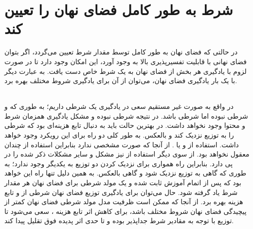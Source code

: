 \section{شرط به طور کامل فضای نهان را تعیین کند}
در حالتی که فضای نهان به طور کامل توسط مقدار شرط تعیین می‌گردد، اگر بتوان فضای نهانی با قابلیت تفسیرپذیری بالا به وجود آورد، این امکان وجود دارد تا در صورت لزوم با یادگیری هر بخش از فضای نهان به یک شرط خاص دست یافت. به عبارت دیگر با یک بار یادگیری فضای نهان، می‌توان از آن برای یادگیری شروط مختلف بهره برد.

\\
در واقع به صورت غیر مستقیم سعی در یادگیری یک \wae{} شرطی داریم؛ به طوری که \encoder{} و \decoder{} شرطی نبوده اما \priordist{} شرطی باشد. در نتیجه \decoder{} شرطی نبوده و مشکل یادگیری همزمان شرط و محتوا وجود نخواهد داشت. در بهترین حالت باید به دنبال تابع هزینه‌ای بود که \priordist{} شرطی را به توزیع \marginal{} \encoder{} نزدیک کند و بالعکس. به طور کلی دو راه برای این رویکرد وجود خواهد داشت. استفاده از \gan{} و یا \mmd{}. از آنجا که \priordist{} صورت مشخصی ندارد بنابراین استفاده از  \mmd{} چندان معقول نخواهد بود. از سوی دیگر استفاده از \gan{} نیز مشکل \modecollapse{} و سایر مشکلات ذکر شده را در پی دارد. بنابراین راه همواری برای نزدیک کردن دو توزیع به یکدیگر وجود ندارد؛ به طوری که گاهی \priordist{} به توزیع \marginal{} \encoder{} نزدیک شود و گاهی بالعکس. به همین دلیل تنها راه این خواهد بود که پس از اتمام آموزش \autoencoder{} ثابت شده و یک مولد شرطی برای فضای نهان هر مقدار شرط یاد گرفته شود. حال می‌توان برای یادگیری توزیع فضای نهان شرطی از \normalizingflownet{} و تابع هزینه \maxlikelihood{} بهره برد. از آنجا که ممکن است ظرفیت مدل مولد شرطی فضای نهان کمتر از پیچیدگی فضای نهان شروط مختلف باشد، برای کاهش اثر \meanseeking{} تابع هزینه \maxlikelihood{}، سعی می‌شود تا توزیع \marginal{} \encoder{} با توجه به مقادیر شرط جدا‌پذیر بوده و تا حدی اثر پدیده فوق تقلیل پیدا کند.
\\
